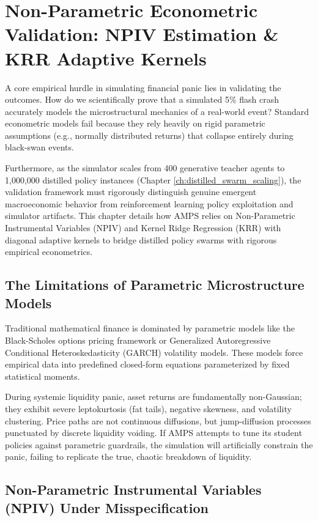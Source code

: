 \chapter{Non-Parametric Econometric Validation: NPIV Estimation \& KRR Adaptive Kernels}
\label{ch:non_parametric_validation}

A core empirical hurdle in simulating financial panic lies in validating the outcomes. How do we scientifically prove that a simulated 5\% flash crash accurately models the microstructural mechanics of a real-world event? Standard econometric models fail because they rely heavily on rigid parametric assumptions (e.g., normally distributed returns) that collapse entirely during black-swan events. 

Furthermore, as the simulator scales from 400 generative teacher agents to 1,000,000 distilled policy instances (Chapter \ref{ch:distilled_swarm_scaling}), the validation framework must rigorously distinguish genuine emergent macroeconomic behavior from reinforcement learning policy exploitation and simulator artifacts. This chapter details how AMPS relies on Non-Parametric Instrumental Variables (NPIV) and Kernel Ridge Regression (KRR) with diagonal adaptive kernels to bridge distilled policy swarms with rigorous empirical econometrics.

\section{The Limitations of Parametric Microstructure Models}

Traditional mathematical finance is dominated by parametric models like the Black-Scholes options pricing framework or Generalized Autoregressive Conditional Heteroskedasticity (GARCH) volatility models. These models force empirical data into predefined closed-form equations parameterized by fixed statistical moments. 

During systemic liquidity panic, asset returns are fundamentally non-Gaussian; they exhibit severe leptokurtosis (fat tails), negative skewness, and volatility clustering. Price paths are not continuous diffusions, but jump-diffusion processes punctuated by discrete liquidity voiding. If AMPS attempts to tune its student policies against parametric guardrails, the simulation will artificially constrain the panic, failing to replicate the true, chaotic breakdown of liquidity.

\section{Non-Parametric Instrumental Variables (NPIV) Under Misspecification}

